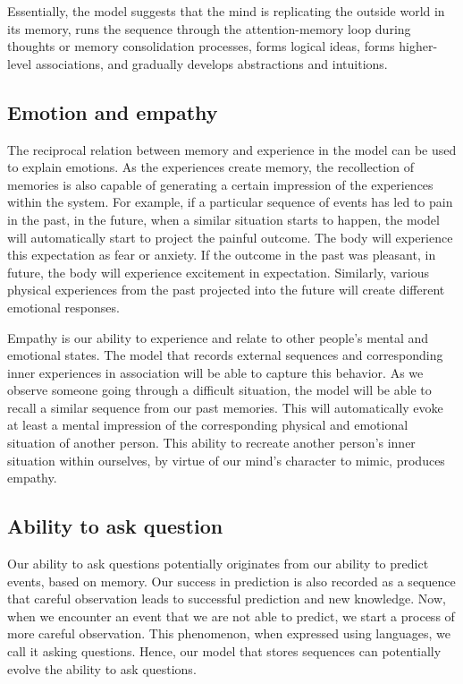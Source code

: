 \documentclass[reprint,amsmath,amssymb,apr,aip,onecolumn, 11pt]{revtex4-1}
\begin{document}
 Essentially, the model suggests that the mind is replicating the outside world in its memory, runs the sequence through the attention-memory loop during thoughts or memory consolidation processes, forms logical ideas, forms higher-level associations, and gradually develops abstractions and intuitions. 



\subsection{Emotion and empathy}

The reciprocal relation between memory and experience in the model can be used to explain emotions. As the experiences create memory, the recollection of memories is also capable of generating a certain impression of the experiences within the system.  For example, if a particular sequence of events has led to pain in the past, in the future, when a similar situation starts to happen, the model will automatically start to project the painful outcome. The body will experience this expectation as fear or anxiety. If the outcome in the past was pleasant, in future, the body will experience excitement in expectation. Similarly, various physical experiences from the past projected into the future will create different emotional responses.

Empathy is our ability to experience and relate to other people's mental and emotional states. The model that records external sequences and corresponding inner experiences in association will be able to capture this behavior. As we observe someone going through a difficult situation, the model will be able to recall a similar sequence from our past memories. This will automatically evoke at least a mental impression of the corresponding physical and emotional situation of another person. This ability to recreate another person's inner situation within ourselves, by virtue of our mind's character to mimic, produces empathy.  

\subsection{Ability to ask question}
Our ability to ask questions potentially originates from our ability to predict events, based on memory. Our success in prediction is also recorded as a sequence that careful observation leads to successful prediction and new knowledge. Now, when we encounter an event that we are not able to predict, we start a process of more careful observation. This phenomenon, when expressed using languages, we call it asking questions. Hence, our model that stores sequences can potentially evolve the ability to ask questions. 
\end{document}
